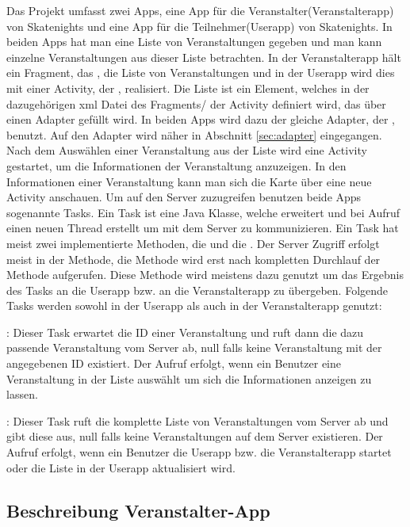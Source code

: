 Das Projekt umfasst zwei Apps, eine App für die Veranstalter(Veranstalterapp) von Skatenights und eine App für die Teilnehmer(Userapp) von Skatenights. In beiden Apps hat man eine Liste von Veranstaltungen gegeben und man kann einzelne Veranstaltungen aus dieser Liste betrachten. In der Veranstalterapp hält ein Fragment, das , die Liste von Veranstaltungen und in der Userapp wird dies mit einer Activity, der , realisiert. Die Liste ist ein  Element, welches in der dazugehörigen xml Datei des Fragments/ der Activity definiert wird, das über einen Adapter gefüllt wird. In beiden Apps wird dazu der gleiche Adapter, der , benutzt. Auf den Adapter wird näher in Abschnitt \ref{sec:adapter} eingegangen. Nach dem Auswählen einer Veranstaltung aus der Liste wird eine Activity gestartet, um die Informationen der Veranstaltung anzuzeigen. In den Informationen einer Veranstaltung kann man sich die Karte über eine neue Activity anschauen. Um auf den Server zuzugreifen benutzen beide Apps sogenannte Tasks. Ein Task ist eine Java Klasse, welche  erweitert und bei Aufruf einen neuen Thread erstellt um mit dem Server zu kommunizieren. Ein Task hat meist zwei implementierte Methoden, die  und die . Der Server Zugriff erfolgt meist in der  Methode, die  Methode wird erst nach kompletten Durchlauf der  Methode aufgerufen. Diese Methode wird meistens dazu genutzt um das Ergebnis des Tasks an die Userapp bzw. an die Veranstalterapp zu übergeben. Folgende Tasks werden sowohl in der Userapp als auch in der Veranstalterapp genutzt: 

: Dieser Task erwartet die ID einer Veranstaltung und ruft dann die dazu passende Veranstaltung vom Server ab, null falls keine Veranstaltung mit der angegebenen ID existiert. Der Aufruf erfolgt, wenn ein Benutzer eine Veranstaltung in der Liste auswählt um sich die Informationen anzeigen zu lassen.

: Dieser Task ruft die komplette Liste von Veranstaltungen vom Server ab und gibt diese aus, null falls keine Veranstaltungen auf dem Server existieren. Der Aufruf erfolgt, wenn ein Benutzer die Userapp bzw. die Veranstalterapp startet oder die Liste in der Userapp aktualisiert wird.

\subsection{Beschreibung Veranstalter-App}
